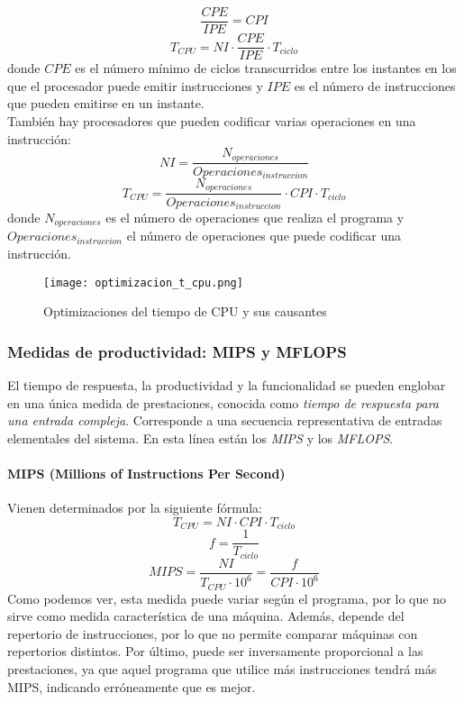 \documentclass[12pt,spanish]{article}
\begin{document}
\[\frac{CPE}{IPE}=CPI\] 	
\begin{equation}
T_{CPU}=NI \cdot \frac{CPE}{IPE} \cdot T_{ciclo}
\end{equation}
donde $CPE$ es el número mínimo de ciclos transcurridos entre los instantes en los que el procesador puede emitir instrucciones y $IPE$ es el número de instrucciones que pueden emitirse en un instante.\\
También hay procesadores que pueden codificar varias operaciones en una instrucción:
\[NI=\frac{N_{operaciones}}{Operaciones_{instruccion}}\]
\begin{equation}
T_{CPU}=\frac{N_{operaciones}}{Operaciones_{instruccion}} \cdot CPI \cdot T_{ciclo}
\end{equation}
donde $N_{operaciones}$ es el número de operaciones que realiza el programa y $Operaciones_{instruccion}$ el número de operaciones que puede codificar una instrucción.
\begin{figure}[H]
\centering
\texttt{[image: optimizacion\_t\_cpu.png]}
\caption{Optimizaciones del tiempo de CPU y sus causantes}
\end{figure}
\subsubsection{Medidas de productividad: MIPS y MFLOPS}
El tiempo de respuesta, la productividad y la funcionalidad se pueden englobar en una única medida de prestaciones, conocida como \emph{tiempo de respuesta para una entrada compleja}. Corresponde a una secuencia representativa de entradas elementales del sistema. En esta línea están los \emph{MIPS} y los \emph{MFLOPS}.
\paragraph{MIPS (Millions of Instructions Per Second)}
Vienen determinados por la siguiente fórmula:
\[T_{CPU}=NI \cdot CPI \cdot T_{ciclo} \]
\[f=\frac{1}{T_{ciclo}} \]
\begin{equation}
MIPS=\frac{NI}{T_{CPU} \cdot 10^6}=\frac{f}{CPI \cdot 10^6}
\end{equation}
Como podemos ver, esta medida puede variar según el programa, por lo que no sirve como medida característica de una máquina. Además, depende del repertorio de instrucciones, por lo que no permite comparar máquinas con repertorios distintos. Por último, puede ser inversamente proporcional a las prestaciones, ya que aquel programa que utilice más instrucciones tendrá más MIPS, indicando erróneamente que es mejor.
\end{document}
